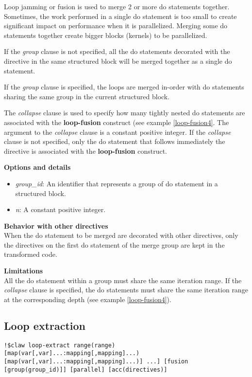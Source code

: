 Loop jamming or fusion is used to merge 2 or more do statements together. Sometimes, the
work performed in a single do statement is too small to create significant impact on
performance when it is parallelized. Merging some do statements together create bigger
blocks (kernels) to be parallelized.

If the \textit{group} clause is not specified, all the do statements decorated with the directive in the
same structured block will be merged together as a single do statement.

If the \textit{group} clause is specified, the loops are merged in-order with do statements sharing 
the same group in the current structured block.

The \textit{collapse} clause is used to specify how many tightly nested do statements are
associated with the \textbf{loop-fusion} construct (see example \ref{loop-fusion4}. The argument to the \textit{collapse}
clause is a constant positive integer. If the \textit{collapse} clause
is not specified, only the do statement that follows immediately the directive is associated with the \textbf{loop-fusion} construct.

\textbf{Options and details}
\begin{itemize}
\item \textit{group\_id}: An identifier that represents a group of do statement in a structured block. 
\item \textit{n}: A constant positive integer.
\end{itemize}

\textbf{Behavior with other directives}\\
When the do statement to be merged are decorated with other directives, only the
directives on the first do statement of the merge group are kept in the transformed
code.

\textbf{Limitations}\\
All the do statement within a group must share the same iteration range. If the
\textit{collapse} clause is specified, the do statements must share the same iteration range at the
corresponding depth (see example \ref{loop-fusion4}).

\subsection{Loop extraction}
\begin{lstlisting}
!$claw loop-extract range(range) [map(var[,var]...:mapping[,mapping]...) [map(var[,var]...:mapping[,mapping]...)] ...] [fusion [group(group_id)]] [parallel] [acc(directives)]
\end{lstlisting}

